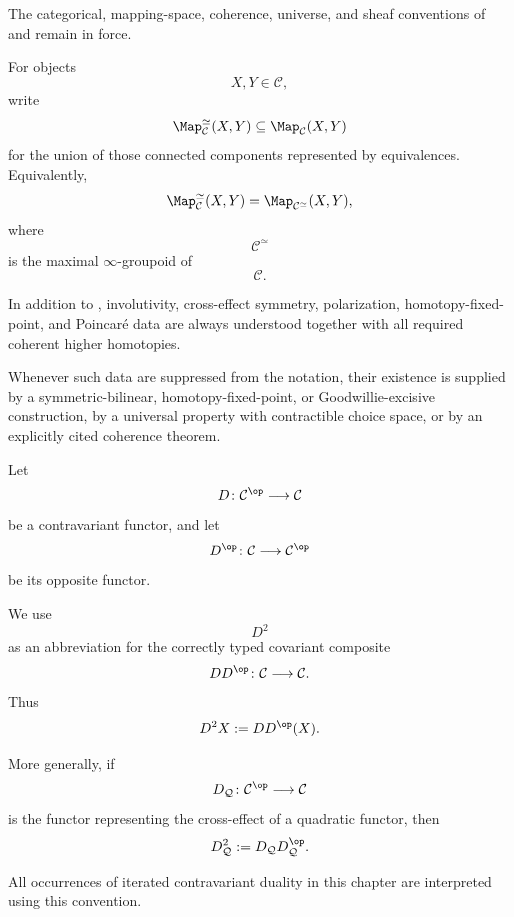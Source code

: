 The categorical, mapping-space, coherence, universe, and sheaf conventions
of
and
remain in force.

\begin{convention}
\label{conv:equivalence-mapping-space}
For objects
\[
    X,Y\in\mathcal C,
\]
write
\[
    \Map^\simeq_{\mathcal C}(X,Y)
    \subseteq
    \Map_{\mathcal C}(X,Y)
\]
for the union of those connected components represented by equivalences.
Equivalently,
\[
    \Map^\simeq_{\mathcal C}(X,Y)
    =
    \Map_{\mathcal C^\simeq}(X,Y),
\]
where
\[
    \mathcal C^\simeq
\]
is the maximal $\infty$-groupoid of
\[
    \mathcal C.
\]
\end{convention}


\begin{convention}
\label{conv:rigid-poincare-higher-coherence}
In addition to
,
involutivity, cross-effect symmetry, polarization, homotopy-fixed-point,
and Poincar\'e data are always understood together with all required
coherent higher homotopies.

Whenever such data are suppressed from the notation, their existence is
supplied by a symmetric-bilinear, homotopy-fixed-point, or
Goodwillie-excisive construction, by a universal property with contractible
choice space, or by an explicitly cited coherence theorem.
\end{convention}

\begin{convention}
\label{conv:double-duality-notation}
Let
\[
    D
    \colon
    \mathcal C^{\op}
    \longrightarrow
    \mathcal C
\]
be a contravariant functor, and let
\[
    D^{\op}
    \colon
    \mathcal C
    \longrightarrow
    \mathcal C^{\op}
\]
be its opposite functor.

We use
\[
    D^2
\]
as an abbreviation for the correctly typed covariant composite
\[
    D D^{\op}
    \colon
    \mathcal C
    \longrightarrow
    \mathcal C.
\]
Thus
\[
    D^2X
    :=
    D D^{\op}(X).
\]

More generally, if
\[
    D_{\mathcal Q}
    \colon
    \mathcal C^{\op}
    \longrightarrow
    \mathcal C
\]
is the functor representing the cross-effect of a quadratic functor, then
\[
    D_{\mathcal Q}^2
    :=
    D_{\mathcal Q}D_{\mathcal Q}^{\op}.
\]

All occurrences of iterated contravariant duality in this chapter are
interpreted using this convention.
\end{convention}

